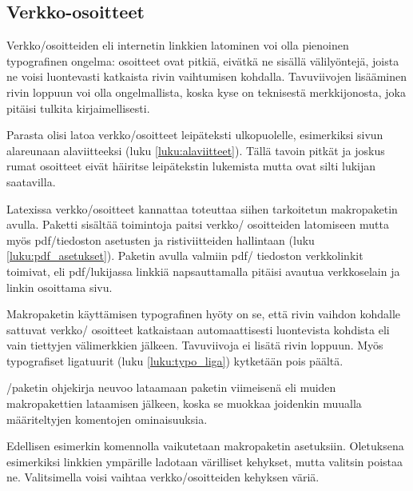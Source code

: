 \subsection{Verkko-osoitteet}

Verkko\-/osoitteiden eli internetin linkkien latominen voi olla
pienoinen typografinen ongelma: osoitteet ovat pitkiä, eivätkä ne
sisällä välilyöntejä, joista ne voisi luontevasti katkaista rivin
vaihtumisen kohdalla. Tavuviivojen lisääminen rivin loppuun voi olla
ongelmallista, koska kyse on teknisestä merkkijonosta, joka pitäisi
tulkita kirjaimellisesti.

Parasta olisi latoa verkko\-/osoitteet leipäteksti ulkopuolelle,
esimerkiksi sivun alareunaan alaviitteeksi (luku
\ref{luku:alaviitteet}). Tällä tavoin pitkät ja joskus rumat osoitteet
eivät häiritse leipätekstin lukemista mutta ovat silti lukijan
saatavilla.

Latexissa verkko\-/osoitteet kannattaa toteuttaa siihen tarkoitetun
makropaketin avulla. Paketti 
sisältää toimintoja paitsi verkko\-/ osoitteiden latomiseen mutta myös
pdf\-/tiedoston asetusten ja ristiviitteiden hallintaan (luku
\ref{luku:pdf_asetukset}). Paketin avulla valmiin pdf\-/ tiedoston
verkkolinkit toimivat, eli pdf\-/lukijassa linkkiä napsauttamalla
pitäisi avautua verkkoselain ja linkin osoittama sivu.

Makropaketin käyttämisen typografinen hyöty on se, että rivin vaihdon
kohdalle sattuvat verkko\-/ osoitteet katkaistaan automaattisesti
luontevista kohdista eli vain tiettyjen välimerkkien jälkeen.
Tavuviivoja ei lisätä rivin loppuun. Myös typografiset ligatuurit (luku
\ref{luku:typo_liga}) kytketään pois päältä.

\-/paketin ohjekirja neuvoo lataamaan paketin
viimeisenä eli muiden makropakettien lataamisen jälkeen, koska se
muokkaa joidenkin muualla määriteltyjen komentojen ominaisuuksia.

\begin{koodilohkosis}
  \usepackage{hyperref}  %
  \hypersetup{hidelinks} %
\end{koodilohkosis}

Edellisen esimerkin komennolla  vaikutetaan
makropaketin asetuksiin. Oletuksena esimerkiksi linkkien ympärille
ladotaan värilliset kehykset, mutta valitsin  poistaa
ne. Valitsimella  voisi vaihtaa verkko\-/osoitteiden
kehyksen väriä.

